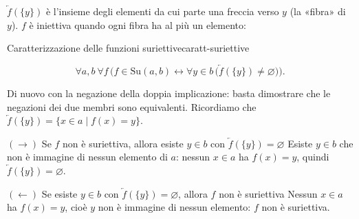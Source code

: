 \begin{spiegazione}
    $\overleftarrow{f}(\{y\})$ è l'insieme degli elementi da cui parte una freccia verso $y$ (la «fibra» di $y$). $f$ è iniettiva quando ogni fibra ha al più un elemento:
    \begin{center}
    \end{center}
\end{spiegazione}


\begin{concetto}
\begin{Teorema}{Caratterizzazione delle funzioni suriettive}{caratt-suriettive}
    \begin{prerequisiti}
    \end{prerequisiti}
    \[ \forall a, b\ \forall f\,\Big(f \in \mathrm{Su}(a, b) \leftrightarrow \forall y \in b\,\big(\overleftarrow{f}(\{y\}) \neq \varnothing\big)\Big). \]
\end{Teorema}
\begin{dimostrazione}
    Di nuovo con la negazione della doppia implicazione: basta dimostrare che le negazioni dei due membri sono equivalenti.
    Ricordiamo che $\overleftarrow{f}(\{y\}) = \{x \in a \mid f(x) = y\}$.
    \begin{caso}{$(\rightarrow)$ Se $f$ non è suriettiva, allora esiste $y \in b$ con $\overleftarrow{f}(\{y\}) = \varnothing$}
        Esiste $y \in b$ che non è immagine di nessun elemento di $a$: nessun $x \in a$ ha $f(x) = y$, quindi $\overleftarrow{f}(\{y\}) = \varnothing$.
    \end{caso}
    \begin{caso}{$(\leftarrow)$ Se esiste $y \in b$ con $\overleftarrow{f}(\{y\}) = \varnothing$, allora $f$ non è suriettiva}
        Nessun $x \in a$ ha $f(x) = y$, cioè $y$ non è immagine di nessun elemento: $f$ non è suriettiva.
    \end{caso}
\end{dimostrazione}
\end{concetto}

